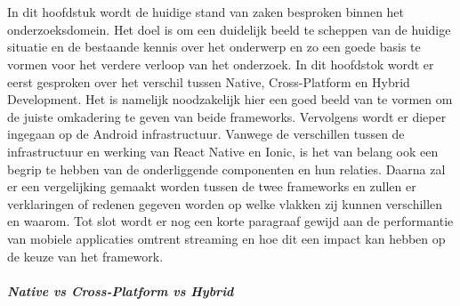 \chapter{}%
\label{ch:stand-van-zaken}



In dit hoofdstuk wordt de huidige stand van zaken besproken binnen het onderzoeksdomein. Het doel is om een duidelijk beeld te scheppen van de huidige situatie en de bestaande kennis over het onderwerp en zo een goede basis te vormen voor het verdere verloop van het onderzoek. In dit hoofdstok wordt er eerst gesproken over het verschil tussen Native, Cross-Platform en Hybrid Development. Het is namelijk noodzakelijk hier een goed beeld van te vormen om de juiste omkadering te geven van beide frameworks. Vervolgens wordt er dieper ingegaan op de Android infrastructuur. Vanwege de verschillen tussen de infrastructuur en werking van React Native en Ionic, is het van belang ook een begrip te hebben van de onderliggende componenten en hun relaties. Daarna zal er een vergelijking gemaakt worden tussen de twee frameworks en zullen er verklaringen of redenen gegeven worden op welke vlakken zij kunnen verschillen en waarom. Tot slot wordt er nog een korte paragraaf gewijd aan de performantie van mobiele applicaties omtrent streaming en hoe dit een impact kan hebben op de keuze van het framework.

\paragraph{Native vs Cross-Platform vs Hybrid}

